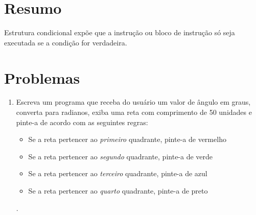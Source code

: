 \section*{Resumo}

Estrutura condicional expõe que a instrução ou bloco de instrução só seja executada se a condição for verdadeira.


%







\section*{Problemas}
\begin{enumerate}
\item
  Escreva um programa que receba do usuário um valor de ângulo em graus, converta para radianos, exiba uma reta com comprimento de 50 unidades e pinte-a de acordo com as seguintes regras:
    \begin{itemize}
    \item
    Se a reta pertencer ao \emph{primeiro} quadrante, pinte-a de vermelho
    \item
    Se a reta pertencer ao \emph{segundo} quadrante, pinte-a de verde
    \item
    Se a reta pertencer ao \emph{terceiro} quadrante, pinte-a de azul
    \item
    Se a reta pertencer ao \emph{quarto} quadrante, pinte-a de preto
    \end{itemize}.
    \label{ex:cap01_ex4}
\end{enumerate}

